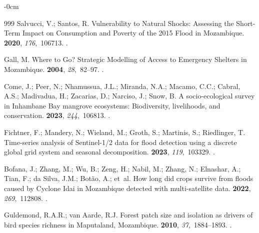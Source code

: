 \documentclass[coasts,article,accept,pdftex,oneauthor]{Definitions/mdpi}
\begin{document}
\begin{adjustwidth}{-\extralength}{0cm}
\begin{thebibliography}{999}
Salvucci, V.; Santos, R.
\newblock Vulnerability to Natural Shocks: Assessing the Short-Term Impact on
  Consumption and Poverty of the 2015 Flood in Mozambique.
 {\bf 2020}, {\em 176},~106713.
.

Gall, M.
\newblock Where to Go? Strategic Modelling of Access to Emergency Shelters in
  Mozambique.
 {\bf 2004}, {\em 28},~82--97.
.

Come, J.; Peer, N.; Nhamussua, J.L.; Miranda, N.A.; Macamo, C.C.; Cabral, A.S.;
  Madivadua, H.; Zacarias, D.; Narciso, J.; Snow, B.
\newblock A socio-ecological survey in Inhambane Bay mangrove ecosystems:
  Biodiversity, livelihoods, and conservation.
 {\bf 2023}, {\em 244},~106813.
.

Fichtner, F.; Mandery, N.; Wieland, M.; Groth, S.; Martinis, S.; Riedlinger, T.
\newblock Time-series analysis of Sentinel-1/2 data for flood detection using a
  discrete global grid system and seasonal decomposition.
 {\bf 2023}, {\em 119},~103329.
.

Bofana, J.; Zhang, M.; Wu, B.; Zeng, H.; Nabil, M.; Zhang, N.; Elnashar, A.;
  Tian, F.; {da Silva}, J.M.; Botão, A.;  et~al.
\newblock How long did crops survive from floods caused by Cyclone Idai in
  Mozambique detected with multi-satellite data.
 {\bf 2022}, {\em 269},~112808.
.

Guldemond, R.A.R.; van Aarde, R.J.
\newblock Forest patch size and isolation as drivers of bird species richness
  in Maputaland, Mozambique.
 {\bf 2010}, {\em 37},~1884--1893.
.


\end{thebibliography}
\end{adjustwidth}
\end{document}
